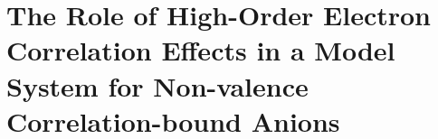 \chapter{ The Role of High-Order Electron Correlation Effects in a Model System for Non-valence Correlation-bound Anions}







